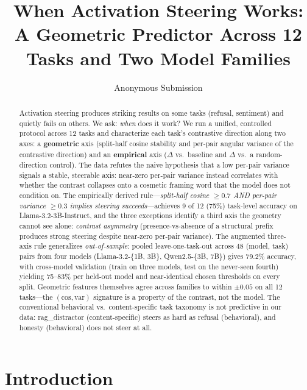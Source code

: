 \documentclass[11pt]{article}
\title{When Activation Steering Works:\\
       A Geometric Predictor Across 12 Tasks and Two Model Families}
\author{Anonymous Submission}
\begin{document}
\maketitle

\begin{abstract}
Activation steering produces striking results on some tasks (refusal,
sentiment) and quietly fails on others. We ask: \emph{when} does it
work? We run a unified, controlled protocol across 12 tasks and
characterize each task's contrastive direction along two axes: a
\textbf{geometric} axis (split-half cosine stability and per-pair
angular variance of the contrastive direction) and an \textbf{empirical}
axis ($\Delta$ vs.~baseline and $\Delta$ vs.~a random-direction control).
The data refutes the naive hypothesis that a low per-pair variance
signals a stable, steerable axis: near-zero per-pair variance instead
correlates with whether the contrast collapses onto a cosmetic
framing word that the model does not condition on. The empirically
derived rule---\emph{split-half cosine $\geq 0.7$ AND per-pair
variance $\geq 0.3$ implies steering succeeds}---achieves 9 of 12
(75\%) task-level accuracy on Llama-3.2-3B-Instruct, and the
three exceptions identify a third axis the geometry cannot see alone:
\emph{contrast asymmetry} (presence-vs-absence of a structural prefix
produces strong steering despite near-zero per-pair variance). The
augmented three-axis rule generalizes \emph{out-of-sample}: pooled
leave-one-task-out across 48 (model, task) pairs from four models
(Llama-3.2-\{1B, 3B\}, Qwen2.5-\{3B, 7B\}) gives 79.2\% accuracy,
with cross-model validation (train on three models, test on the
never-seen fourth) yielding 75--83\% per held-out model and
near-identical chosen thresholds on every split. Geometric features
themselves agree across families to within $\pm 0.05$ on all 12
tasks---the $(\text{cos}, \text{var})$ signature is a property of the
contrast, not the model. The conventional behavioral
vs.~content-specific task taxonomy is not predictive in our data:
rag\_distractor (content-specific) steers as hard as refusal
(behavioral), and honesty (behavioral) does not steer at all.
\end{abstract}

\section{Introduction}
\end{document}
